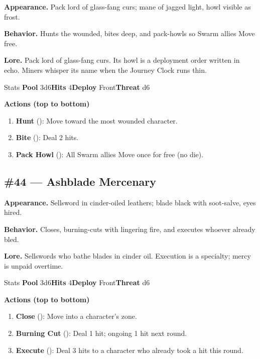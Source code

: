 \textbf{Appearance.} Pack lord of glass-fang curs; mane of jagged light, howl visible as frost.

\textbf{Behavior.} Hunts the wounded, bites deep, and pack-howls so Swarm allies Move free.

\textbf{Lore.} Pack lord of glass-fang curs. Its howl is a deployment order written in echo. Miners whisper its name when the Journey Clock runs thin.

\begin{monsterentry}{Stats}
\textbf{Pool} 3d6\quad\textbf{Hits} 4\quad\textbf{Deploy} Front\quad\textbf{Threat} d6

\textbf{Actions (top to bottom)}
\begin{enumerate}\setlength{\itemsep}{0.15em}\setlength{\parskip}{0pt}
  \item \textbf{Hunt} (\easy): Move toward the most wounded character.
  \item \textbf{Bite} (\medium): Deal 2 hits.
  \item \textbf{Pack Howl} (\hard): All Swarm allies Move once for free (no die).
\end{enumerate}
\end{monsterentry}

\subsection*{\#44 --- Ashblade Mercenary}

\textbf{Appearance.} Sellsword in cinder-oiled leathers; blade black with soot-salve, eyes hired.

\textbf{Behavior.} Closes, burning-cuts with lingering fire, and executes whoever already bled.

\textbf{Lore.} Sellswords who bathe blades in cinder oil. Execution is a specialty; mercy is unpaid overtime.

\begin{monsterentry}{Stats}
\textbf{Pool} 3d6\quad\textbf{Hits} 4\quad\textbf{Deploy} Front\quad\textbf{Threat} d6

\textbf{Actions (top to bottom)}
\begin{enumerate}\setlength{\itemsep}{0.15em}\setlength{\parskip}{0pt}
  \item \textbf{Close} (\easy): Move into a character's zone.
  \item \textbf{Burning Cut} (\medium): Deal 1 hit; ongoing 1 hit next round.
  \item \textbf{Execute} (\hard): Deal 3 hits to a character who already took a hit this round.
\end{enumerate}
\end{monsterentry}

